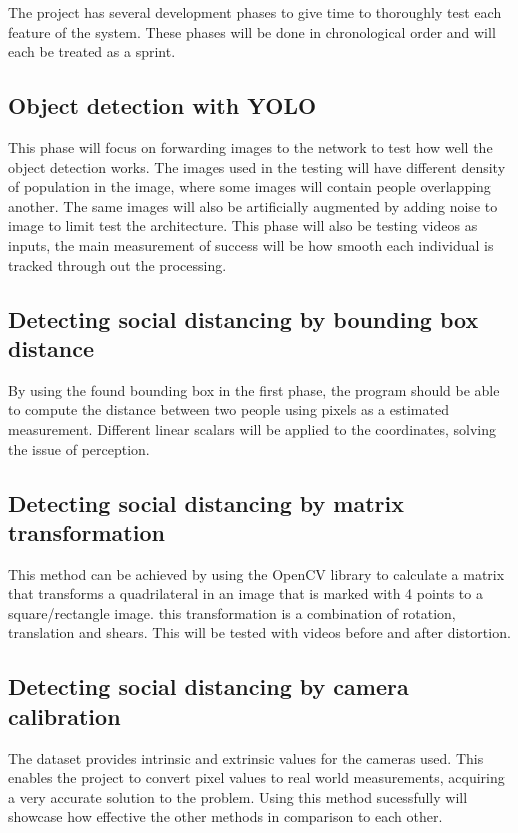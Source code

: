 \documentclass[12pt]{report}
\begin{document}
The project has several development phases to give time to thoroughly test each feature of the system. These phases will be done in chronological order and will each be treated as a sprint.

\subsection*{Object detection with YOLO}

This phase will focus on forwarding images to the network to test how well the object detection works. The images used in the testing will have different density of population in the image, where some images will contain people overlapping another. The same images will also be artificially augmented by adding noise to image to limit test the architecture. This phase will also be testing videos as inputs, the main measurement of success will be how smooth each individual is tracked through out the processing.

\subsection*{Detecting social distancing by bounding box distance}

By using the found bounding box in the first phase, the program should be able to compute the distance between two people using pixels as a estimated measurement. Different linear scalars will be applied to the coordinates, solving the issue of perception.

\subsection*{Detecting social distancing by matrix transformation}

This method can be achieved by using the OpenCV library to calculate a matrix that transforms a quadrilateral in an image that is marked with 4 points to a square/rectangle image. this transformation is a combination of rotation, translation and shears. This will be tested with videos before and after distortion.

\subsection*{Detecting social distancing by camera calibration}

The dataset provides intrinsic and extrinsic values for the cameras used. This enables the project to convert pixel values to real world measurements, acquiring a very accurate solution to the problem. Using this method sucessfully will showcase how effective the other methods in comparison to each other.
\end{document}

